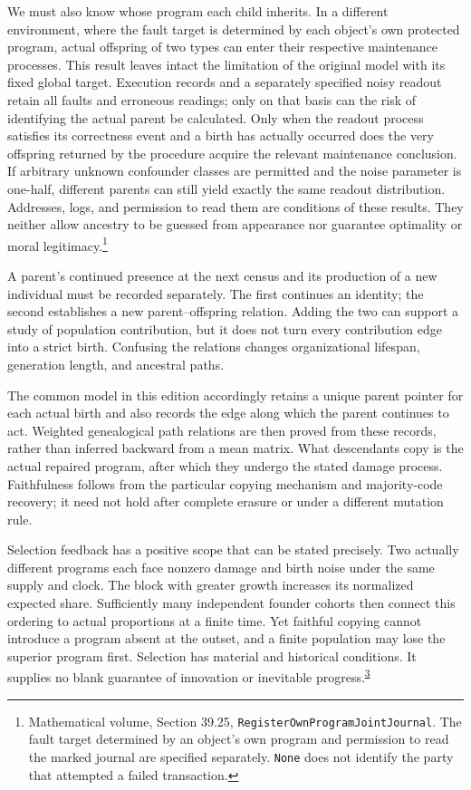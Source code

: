 \documentclass[
  english,
  11pt,
  oneside]{book}
\begin{document}
We must also know whose program each child inherits. In a different environment, where the fault target is determined by each object's own protected program, actual offspring of two types can enter their respective maintenance processes. This result leaves intact the limitation of the original model with its fixed global target. Execution records and a separately specified noisy readout retain all faults and erroneous readings; only on that basis can the risk of identifying the actual parent be calculated. Only when the readout process satisfies its correctness event and a birth has actually occurred does the very offspring returned by the procedure acquire the relevant maintenance conclusion. If arbitrary unknown confounder classes are permitted and the noise parameter is one-half, different parents can still yield exactly the same readout distribution. Addresses, logs, and permission to read them are conditions of these results. They neither allow ancestry to be guessed from appearance nor guarantee optimality or moral legitimacy.\footnote{\hypertarget{ph-note-49}{}Mathematical volume, Section 39.25, \nolinkurl{RegisterOwnProgramJointJournal}. The fault target determined by an object's own program and permission to read the marked journal are specified separately. \texttt{None} does not identify the party that attempted a failed transaction.}

A parent's continued presence at the next census and its production of a new individual must be recorded separately. The first continues an identity; the second establishes a new parent--offspring relation. Adding the two can support a study of population contribution, but it does not turn every contribution edge into a strict birth. Confusing the relations changes organizational lifespan, generation length, and ancestral paths.

The common model in this edition accordingly retains a unique parent pointer for each actual birth and also records the edge along which the parent continues to act. Weighted genealogical path relations are then proved from these records, rather than inferred backward from a mean matrix. What descendants copy is the actual repaired program, after which they undergo the stated damage process. Faithfulness follows from the particular copying mechanism and majority-code recovery; it need not hold after complete erasure or under a different mutation rule.

\begingroup{}

Selection feedback has a positive scope that can be stated precisely. Two actually different programs each face nonzero damage and birth noise under the same supply and clock. The block with greater growth increases its normalized expected share. Sufficiently many independent founder cohorts then connect this ordering to actual proportions at a finite time. Yet faithful copying cannot introduce a program absent at the outset, and a finite population may lose the superior program first. Selection has material and historical conditions. It supplies no blank guarantee of innovation or inevitable progress.\textsuperscript{\hyperlink{ph-note-3}{3}}
\end{document}
